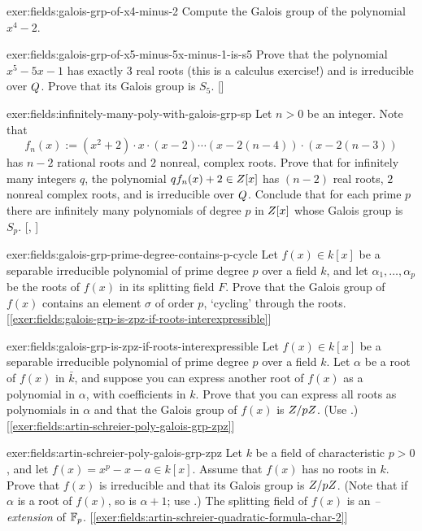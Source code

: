 \begin{exer}{}{exer:fields:galois-grp-of-x4-minus-2}
  Compute the Galois group of the polynomial $x^4 - 2$.
\end{exer}
\begin{exer}{}{exer:fields:galois-grp-of-x5-minus-5x-minus-1-is-s5}
  Prove that the polynomial $x^5 - 5x - 1$ has exactly $3$ real roots
  (this is a calculus exercise!) and is irreducible over $Q$. Prove
  that its Galois group is
  $S_5$. []
\end{exer}
\begin{exer}{}{exer:fields:infinitely-many-poly-with-galois-grp-sp}
  Let $n > 0$ be an integer. Note that
  \[
    f_n(x) := (x^2 + 2) \cdot x \cdot (x-2) \cdots (x - 2(n-4)) \cdot
    (x - 2(n-3))
  \]
  has $n - 2$ rational roots and $2$ nonreal, complex roots. Prove
  that for infinitely many integers $q$, the polynomial
  $qf_n(x) + 2 \in Z[x]$ has $(n-2)$ real roots, $2$ nonreal complex
  roots, and is irreducible over $Q$. Conclude that for each prime
  $p$ there are infinitely many polynomials of degree $p$ in $Z[x]$
  whose Galois group is $S_p$.
  [,
  ]
\end{exer}
\begin{exer}{}{exer:fields:galois-grp-prime-degree-contains-p-cycle}
  Let $f(x) \in k[x]$ be a separable irreducible polynomial of prime
  degree $p$ over a field $k$, and let $\alpha_1, \dots, \alpha_p$ be
  the roots of $f(x)$ in its splitting field $F$. Prove that the
  Galois group of $f(x)$ contains an element $\sigma$ of order $p$,
  `cycling' through the
  roots. [\ref{exer:fields:galois-grp-is-zpz-if-roots-interexpressible}]
\end{exer}
\begin{exer}{}{exer:fields:galois-grp-is-zpz-if-roots-interexpressible}
  Let $f(x) \in k[x]$ be a separable irreducible polynomial of prime
  degree $p$ over a field $k$. Let $\alpha$ be a root of $f(x)$ in
  $\bar{k}$, and suppose you can express another root of $f(x)$ as a
  polynomial in $\alpha$, with coefficients in $k$. Prove that you can
  express all roots as polynomials in $\alpha$ and that the Galois
  group of $f(x)$ is $Z/pZ$. (Use
  .)
  [\ref{exer:fields:artin-schreier-poly-galois-grp-zpz}]
\end{exer}
\begin{exer}{}{exer:fields:artin-schreier-poly-galois-grp-zpz}
  Let $k$ be a field of characteristic $p > 0$, and let
  $f(x) = x^p - x - a \in k[x]$. Assume that $f(x)$ has no roots in
  $k$. Prove that $f(x)$ is irreducible and that its Galois group is
  $Z/pZ$. (Note that if $\alpha$ is a root of $f(x)$, so is
  $\alpha + 1$; use
  .)
  The splitting field of
  $f(x)$ is an \emph{-- extension} of
  $\mathbb{F}_p$. [\ref{exer:fields:artin-schreier-quadratic-formula-char-2}]
\end{exer}
